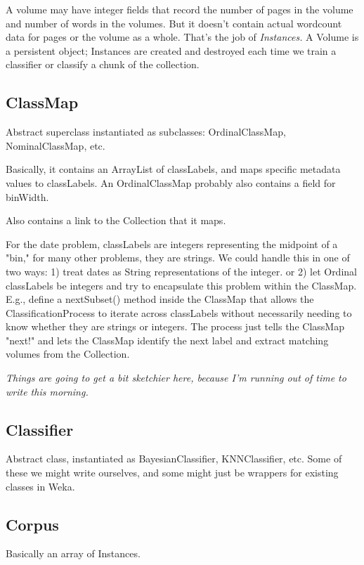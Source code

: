 \documentclass[12pt]{article}
\begin{document}
A volume may have integer fields that record the number of pages in the volume and number of words in the volumes. But it doesn't contain actual wordcount data for pages or the volume as a whole. That's the job of \emph{Instances.} A Volume is a persistent object; Instances are created and destroyed each time we train a classifier or classify a chunk of the collection.

\subsection{ClassMap}
Abstract superclass instantiated as subclasses: OrdinalClassMap, NominalClassMap, etc.

Basically, it contains an ArrayList of classLabels, and maps specific metadata values to classLabels. An OrdinalClassMap probably also contains a field for binWidth.

Also contains a link to the Collection that it maps.

For the date problem, classLabels are integers representing the midpoint of a "bin," for many other problems, they are strings. We could handle this in one of two ways: 1) treat dates as String representations of the integer. or 2) let Ordinal classLabels be integers and try to encapsulate this problem within the ClassMap. E.g., define a nextSubset() method inside the ClassMap that allows the ClassificationProcess to iterate across classLabels without necessarily needing to know whether they are strings or integers. The process just tells the ClassMap "next!" and lets the ClassMap identify the next label and extract matching volumes from the Collection.

\vspace{5 mm}

\emph{Things are going to get a bit sketchier here, because I'm running out of time to write this morning.}

\subsection{Classifier}
Abstract class, instantiated as BayesianClassifier, KNNClassifier, etc. Some of these we might write ourselves, and some might just be wrappers for existing classes in Weka.

\subsection{Corpus}
Basically an array of Instances.
\end{document}
